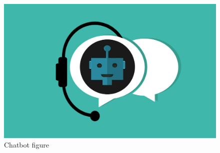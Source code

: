 \begin{figure}
    \centering
    \includegraphics[width=\textwidth]{chatbot.jpg}
    \caption{Chatbot figure}
    \label{fig:chabot}
\end{figure}